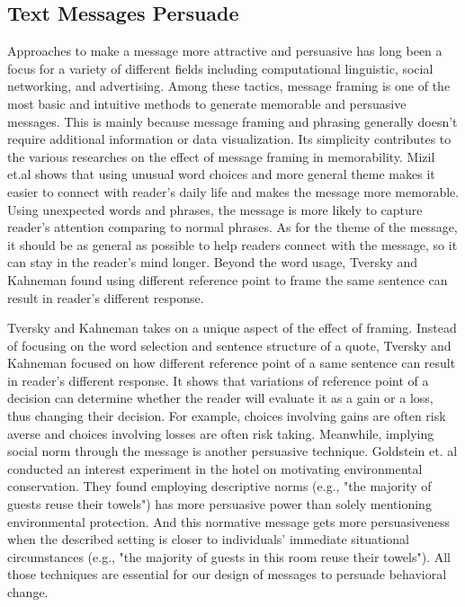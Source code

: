 \subsection{Text Messages Persuade}
Approaches to make a message more attractive and persuasive has long been a focus for a variety of different fields including computational linguistic, social networking, and advertising. Among these tactics, message framing is one of the most basic and intuitive methods to generate memorable and persuasive messages. This is mainly because message framing and phrasing generally doesn't require additional information or data visualization. Its simplicity contributes to the various researches on the effect of message framing in memorability. Mizil et.al shows that using unusual word choices and more general theme makes it easier to connect with reader's daily life and makes the message more memorable. Using unexpected words and phrases, the message is more likely to capture reader's attention comparing to normal phrases. As for the theme of the message, it should be as general as possible to help readers connect with the message, so it can stay in the reader's mind longer. Beyond the word usage, Tversky and Kahneman found using different reference point to frame the same sentence can result in reader's different response.\par
Tversky and Kahneman takes on a unique aspect of the effect of framing. Instead of focusing on the word selection and sentence structure of a quote, Tversky and Kahneman focused on how different reference point of a same sentence can result in reader's different response. It shows that variations of reference point of a decision can determine whether the reader will evaluate it as a gain or a loss, thus changing their decision. For example, choices involving gains are often risk averse and choices involving losses are often risk taking. Meanwhile, implying social norm through the message is another persuasive technique.  Goldstein et. al conducted an interest experiment in the hotel on motivating environmental conservation. They found employing descriptive norms (e.g., "the majority of guests reuse their towels") has more persuasive power than solely mentioning environmental protection. And this normative message gets more persuasiveness when the described setting is closer to individuals' immediate situational circumstances (e.g., "the majority of guests in this room reuse their towels").  All those techniques are essential for our design of messages to persuade behavioral change.\par


